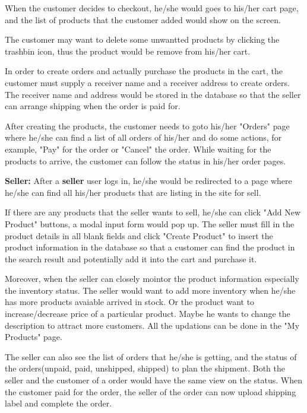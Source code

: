 \documentclass[12pt]{article}
\begin{document}
    When the customer decides to checkout, he/she would goes to his/her cart page, and the list of products that the 
    customer added would show on the screen. 
    
    The customer may want to delete some unwantted products by clicking the trashbin icon, thus the product would be 
    remove from his/her cart. 
    
    In order to create orders and actually purchase the products in the cart, the customer must supply a receiver name 
    and a receiver address to create orders. The receiver name and address would be stored in the database so that the seller can arrange shipping when the order 
    is paid for. 
    
    After creating the products, the customer needs to goto his/her "Orders" page where he/she can find a list of all orders of his/her and do 
    some actions, for example, "Pay" for the order or "Cancel" the order. While waiting for the products to arrive, the customer can follow the status in his/her
    order pages. 

\vspace*{5mm}
\textbf{Seller:} After a \textbf{seller} user logs in, he/she would be redirected to a page where he/she can find 
all his/her products that are listing in the site for sell. 

If there are any products that the seller wants to sell, 
he/she can click "Add New Product" buttons, a modal input form would pop up. The seller must fill in the product details 
in all blank fields and click "Create Product" to insert the product information in the database so that a customer can find 
the product in the search result and potentially add it into the cart and purchase it.

Moreover, when the seller can closely mointor the product information especially the inventory status. The seller would want
to add more inventory when he/she has more products avaiable arrived in stock. Or the product want to increase/decrease price of a 
particular product. Maybe he wants to change the description to attract more customers. All the updations can be done in the "My Products" page.

The seller can also see the list of orders that he/she is getting, and the status of the orders(unpaid, paid, unshipped, shipped) to plan the shipment.
Both the seller and the customer of a order would have the same view on the status. When the customer paid for the order, the seller of the 
order can now upload shipping label and complete the order.
\end{document}
